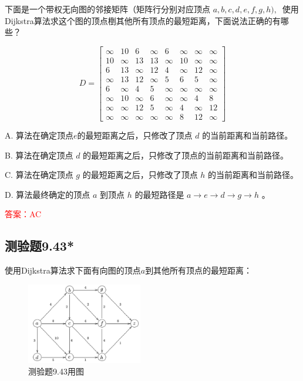 \documentclass[UTF8, heading=true]{ctexart}
\begin{document}
下面是一个带权无向图的邻接矩阵（矩阵行分别对应顶点 $a, b, c, d, e, f, g, h), ~$ 使用Dijkstra算法求这个图的顶点椡其他所有顶点的最短距离，下面说法正确的有哪些？
\begin{table}[H]
  \renewcommand{\arraystretch}{1.3}
$$D=\left[\begin{array}{cccccccc}\infty & 10 & 6 & \infty & 6 & \infty & \infty & \infty \\ 10 & \infty & 13 & 13 & \infty & 10 & \infty & \infty \\ 6 & 13 & \infty & 12 & 4 & \infty & 12 & \infty \\ \infty & 13 & 12 & \infty & 5 & 6 & 5 & \infty \\ 6 & \infty & 4 & 5 & \infty & \infty & \infty & \infty \\ \infty & 10 & \infty & 6 & \infty & \infty & 4 & 8 \\ \infty & \infty & 12 & 5 & \infty & 4 & \infty & 12 \\ \infty & \infty & \infty & \infty & \infty & 8 & 12 & \infty\end{array}\right]$$
\end{table}

A. 算法在确定顶点$e$的最短距离之后，只修改了顶点 $d$ 的当前距离和当前路径。

B. 算法在确定顶点 $d$ 的最短距离之后，只修改了顶点的当前距离和当前路径。

C. 算法在确定顶点 $g$ 的最短距离之后，只修改了顶点 $h$ 的当前距离和当前路径。

D. 算法最终确定的顶点 $a$ 到顶点 $h$ 的最短路径是 $a \rightarrow e \rightarrow d \rightarrow g \rightarrow h$ 。


\textcolor{red}{答案：AC}

\subsection{测验题9.43*}

使用Dijkstra算法求下面有向图的顶点$a$到其他所有顶点的最短距离：

\begin{figure}[H]
  \centering
  \includegraphics[width=0.45\textwidth]{9.43.jpg} %
  \caption{测验题9.43用图}
\end{figure}
\end{document}
